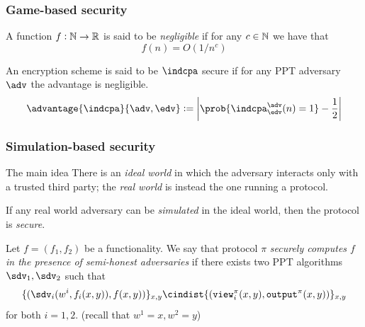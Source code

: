 \documentclass{beamer}
\begin{document}
    \begin{frame}
        \frametitle{Game-based security}
        
        \begin{definition}
            A function $f:\mathbb{N}\to\mathbb{R}$ is said to be \emph{negligible} if for any $c\in\mathbb{N}$ we have that $$f(n)=O(1/n^c)$$
        \end{definition}
        
         \begin{definition}
            An encryption scheme is said to be $\indcpa$ secure if for any PPT adversary $\adv$ the advantage is negligible.
            $$\advantage{\indcpa}{\adv,\edv}:=\left| \prob{\indcpa^\adv_\edv(n)=1}-\frac12 \right|$$
        \end{definition}
    \end{frame}

    \begin{frame}
        \frametitle{Simulation-based security}
        
        \begin{block}{The main idea}
            There is an \emph{ideal world} in which the adversary interacts only with a trusted third party; the \emph{real world} is instead the one running a protocol.
            
            If any real world adversary can be \emph{simulated} in the ideal world, then the protocol is \emph{secure}.
        \end{block}
    
        \begin{definition}
            Let $f=(f_1,f_2)$ be a functionality. We say that protocol $\pi$ \emph{securely computes $f$ in the presence of semi-honest adversaries} if there exists two PPT algorithms $\sdv_1,\sdv_2$ such that
            $$ \{ (\sdv_i(w^i,f_i(x,y)), f(x,y) ) \}_{x,y} \cindist \{ (\texttt{view}_i^\pi(x,y), \texttt{output}^\pi(x,y)) \}_{x,y} $$
            for both $i=1,2$. (recall that $w^1=x,w^2=y$)
        \end{definition}
    \end{frame}
\end{document}
